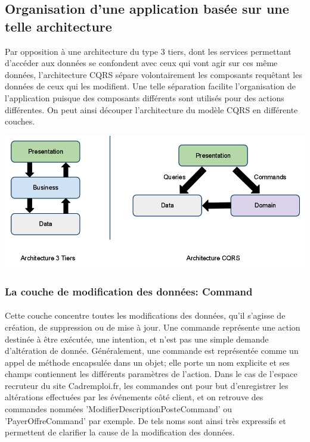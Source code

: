 \subsection{Organisation d'une application basée sur une telle architecture}
Par opposition à une architecture du type 3 tiers, dont les services permettant d'accéder aux données se confondent avec ceux qui vont agir sur ces même données, l'architecture CQRS sépare volontairement les composants requêtant les données de ceux qui les modifient.
Une telle séparation facilite l'organisation de l'application puisque des composants différents sont utilisés pour des actions différentes.
On peut ainsi découper l'architecture du modèle CQRS en différente couches.

\includegraphics[scale=0.5]{Figures/Chapter3/architecture/tiersvscqrs.png}

\subsubsection{La couche de modification des données: Command}
\label{subs:La couche de modification des données: Command}
\paragraph{}
Cette couche concentre toutes les modifications des données, qu'il s'agisse de création, de suppression ou de mise à jour.
Une commande représente une action destinée à être exécutée, une intention, et n'est pas une simple demande d'altération de donnée.
Généralement, une commande est représentée comme un appel de méthode encapsulée dans un objet; elle porte un nom explicite et ses champs contiennent les différents paramètres de l'action.
Dans le cas de l'espace recruteur du site Cadremploi.fr, les commandes ont pour but d'enregistrer les altérations effectuées par les événements côté client, et on retrouve des commandes nommées 'ModifierDescriptionPosteCommand' ou 'PayerOffreCommand' par exemple.
De tels noms sont ainsi très expressifs et permettent de clarifier la cause de la modification des données.

